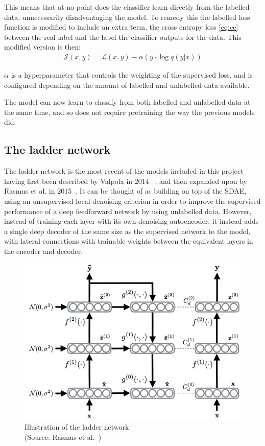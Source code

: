\documentclass[12pt,a4paper,twoside,openright]{report}
\begin{document}
This means that at no point does the classifier learn directly from the labelled data, unnecessarily disadvantaging the model. To remedy
this the labelled loss function is modified to include an extra term, the cross entropy loss \eqref{eq:ce} between the real label and the 
label the classifier outputs for the data. This modified version is then:
\begin{align}
  \mathcal{J}(x, y) = \mathcal{L}(x, y) - \alpha (y \cdot \log q(y|x))
\end{align}

$\alpha$ is a hyperparameter that controls the weighting of the supervised loss, and is configured depending on the amount of labelled and 
unlabelled data available.

The model can now learn to classify from both labelled and unlabelled data at the same time, and so does not require pretraining the way
the previous models did.

\subsection{The ladder network} \label{ladder}

The ladder network is the most recent of the models included in this project having first been described by Valpola in 2014
~\cite{DBLP:journals/corr/Valpola14}, and then expanded upon by Rasmus et al. in 2015~\cite{DBLP:journals/corr/RasmusVHBR15}. 
It can be thought of as building on top of the SDAE, using an unsupervised local denoising 
criterion in order to improve the supervised performance of a deep feedforward network by using unlabelled data. However, instead of 
training each layer with its own denoising autoencoder, it instead adds a single deep decoder of the same size as the supervised network 
to the model, with lateral connections with trainable weights between the equivalent layers in the encoder and decoder.

\begin{figure}[H]
  \centering
  \includegraphics[scale=0.25]{figs/ladder.png}
  \caption[Illustration of the ladder network]{Illustration of the ladder network \\ (Source: Rasmus et al.~\cite{DBLP:journals/corr/RasmusVHBR15})}
  \label{fig:ladder}
\end{figure}
\end{document}
